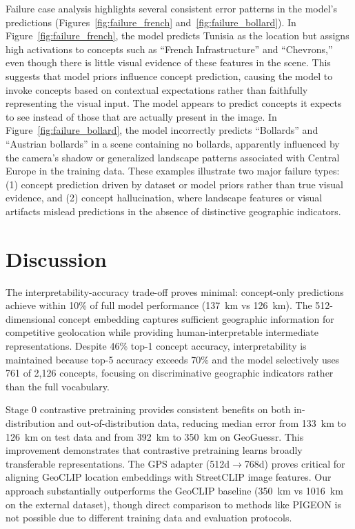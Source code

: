\documentclass{uva-inf-article}
\begin{document}
Failure case analysis highlights several consistent error patterns in the model's predictions (Figures~\ref{fig:failure_french} and~\ref{fig:failure_bollard}). In Figure~\ref{fig:failure_french}, the model predicts Tunisia as the location but assigns high activations to concepts such as ``French Infrastructure'' and ``Chevrons,'' even though there is little visual evidence of these features in the scene. This suggests that model priors influence concept prediction, causing the model to invoke concepts based on contextual expectations rather than faithfully representing the visual input. The model appears to predict concepts it expects to see instead of those that are actually present in the image. In Figure~\ref{fig:failure_bollard}, the model incorrectly predicts ``Bollards'' and ``Austrian bollards'' in a scene containing no bollards, apparently influenced by the camera's shadow or generalized landscape patterns associated with Central Europe in the training data. These examples illustrate two major failure types: (1) concept prediction driven by dataset or model priors rather than true visual evidence, and (2) concept hallucination, where landscape features or visual artifacts mislead predictions in the absence of distinctive geographic indicators.


\section{Discussion}
\label{sec:discussion}

The interpretability-accuracy trade-off proves minimal: concept-only predictions achieve within 10\% of full model performance (137~km vs 126~km). The 512-dimensional concept embedding captures sufficient geographic information for competitive geolocation while providing human-interpretable intermediate representations. Despite 46\% top-1 concept accuracy, interpretability is maintained because top-5 accuracy exceeds 70\% and the model selectively uses 761 of 2,126 concepts, focusing on discriminative geographic indicators rather than the full vocabulary.

Stage 0 contrastive pretraining provides consistent benefits on both in-distribution and out-of-distribution data, reducing median error from 133~km to 126~km on test data and from 392~km to 350~km on GeoGuessr. This improvement demonstrates that contrastive pretraining learns broadly transferable representations. The GPS adapter (512d$\to$768d) proves critical for aligning GeoCLIP location embeddings with StreetCLIP image features. Our approach substantially outperforms the GeoCLIP baseline (350~km vs 1016~km on the external dataset), though direct comparison to methods like PIGEON is not possible due to different training data and evaluation protocols.
\end{document}
